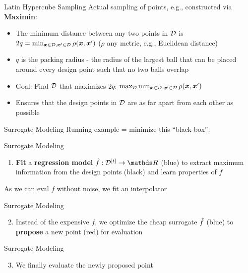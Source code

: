 \documentclass[11pt,compress,t,notes=noshow, xcolor=table]{beamer}
\begin{document}
\begin{framev}{Latin Hypercube Sampling}
Actual sampling of points, e.g., constructed via \textbf{Maximin}:
\begin{itemize}
\item The minimum distance between any two points in $\mathcal{D}$ is $2q = \min_{\bm{x} \in \mathcal{D}, \bm{x}' \in \mathcal{D}} \rho(\bm{x}, \bm{x}')$ ($\rho$ any metric, e.g., Euclidean distance)
\item $q$ is the packing radius - the radius of the largest ball that can be placed around every design point such that no two balls overlap
\item Goal: Find $\mathcal{D}$ that maximizes $2q$: $\max_{\mathcal{D}} \min_{\bm{x} \in \mathcal{D}, \bm{x}' \in \mathcal{D}} \rho(\bm{x}, \bm{x}')$
\item Ensures that the design points in $\mathcal{D}$ are as far apart from each other as possible
\end{itemize}
\end{framev}


\begin{framev}{Surrogate Modeling}
Running example = minimize this \enquote{black-box}:
\vfill
{}
\end{framev}


\begin{framev}{Surrogate Modeling}
\begin{enumerate}
\item \textbf{Fit} a \textbf{regression model} $\fh: \Dt \rightarrow \R$ (blue) to extract maximum information from the design points (black) and learn properties of $f$
\end{enumerate}
\vfill
{}
\begin{center}
As we can eval $f$ without noise, we fit an interpolator
\end{center}
\end{framev}


\begin{framev}{Surrogate Modeling}
\begin{enumerate}
\setcounter{enumi}{1}
\item Instead of the expensive $f$, we optimize the cheap surrogate $\hat{f}$ (blue) to \textbf{propose} a new point (red) for evaluation 
\end{enumerate}
\vfill
{}
\end{framev}


\begin{framev}{Surrogate Modeling}
\begin{enumerate}
\setcounter{enumi}{2}
\item We finally evaluate the newly proposed point
\end{enumerate}
\vfill
{}
\end{framev}
\end{document}
